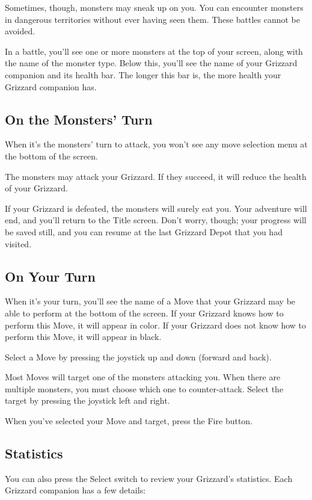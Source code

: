 \documentclass[12pt,twoside,openright,book]{memoir}
\begin{document}
Sometimes,  though, monsters  may sneak  up  on you.  You can  encounter
monsters  in  dangerous  territories  without  ever  having  seen  them.
These battles cannot be avoided.

In a battle, you'll see one or  more monsters at the top of your screen,
along with the name of the monster type. Below this, you'll see the name
of your Grizzard  companion and its health bar. The  longer this bar is,
the more health your Grizzard companion has.

\subsection{On the Monsters' Turn}

When it's the monsters' turn to attack, you won't see any move selection
menu at the bottom of the screen.

The monsters may  attack your Grizzard. If they succeed,  it will reduce
the health of your Grizzard.

If  your  Grizzard  is  defeated,  the monsters  will  surely  eat  you.
Your  adventure  will  end,  and  you'll return  to  the  Title  screen.
Don't worry,  though; your  progress will  be saved  still, and  you can
resume at the last Grizzard Depot that you had visited.

\subsection{On Your Turn}

When it's your turn, you'll see the name of a Move that your Grizzard may be
able to perform at the bottom of the screen. If your Grizzard knows how to
perform this Move, it will appear in color. If your Grizzard does not know
how to perform this Move, it will appear in black.

Select a Move by pressing the joystick up and down (forward and back).

Most Moves will target one of the monsters attacking you. When there are
multiple monsters, you must choose which one to counter-attack. Select the
target by pressing the joystick left and right.

When you've selected your Move and target, press the Fire button.

\subsection{Statistics}

You can also press the Select switch to review your Grizzard's statistics.
Each Grizzard companion has a few details:
\end{document}
